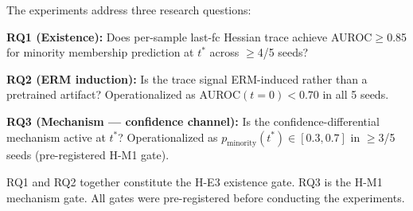 The experiments address three research questions:

\textbf{RQ1 (Existence):} Does per-sample last-fc Hessian trace achieve AUROC$\geq$0.85 for minority membership prediction at $t^*$ across $\geq$4/5 seeds?

\textbf{RQ2 (ERM induction):} Is the trace signal ERM-induced rather than a pretrained artifact? Operationalized as AUROC$(t{=}0) < 0.70$ in all 5 seeds.

\textbf{RQ3 (Mechanism --- confidence channel):} Is the confidence-differential mechanism active at $t^*$? Operationalized as $p_{\text{minority}}(t^*) \in [0.3, 0.7]$ in $\geq$3/5 seeds (pre-registered H-M1 gate).

RQ1 and RQ2 together constitute the H-E3 existence gate. RQ3 is the H-M1 mechanism gate. All gates were pre-registered before conducting the experiments.
